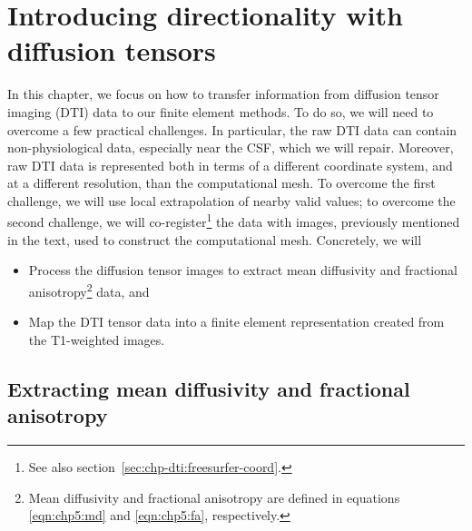 \chapter{Introducing directionality with diffusion tensors}
\label{chap:dti}
In this chapter, we focus on how to transfer information from
diffusion tensor imaging (DTI) data to our finite element
methods. To do so, we will need to overcome a few practical
challenges. In particular, the raw DTI data can contain non-physiological 
data, especially near the CSF, which we will repair.  Moreover, raw DTI data 
is represented both in terms of a different coordinate system, and at a 
different resolution, than the computational mesh.  To overcome the 
first challenge, we will use local extrapolation of nearby valid values; 
to overcome the second challenge, we will co-register\footnote{
See also section~\ref{sec:chp-dti:freesurfer-coord}.} the data 
with images, previously mentioned in the text, used to construct the 
computational mesh.  
%
Concretely, we will
\begin{itemize}
\item
  Process the diffusion tensor images to extract mean diffusivity and
  fractional anisotropy\footnote{Mean diffusivity and fractional 
  anisotropy are defined in equations \eqref{eqn:chp5:md} and 
  \eqref{eqn:chp5:fa}, respectively.} data, and
\item
  Map the DTI tensor data into a finite element representation created from
  the T1-weighted images.
\end{itemize}

\section{Extracting mean diffusivity and fractional anisotropy}

